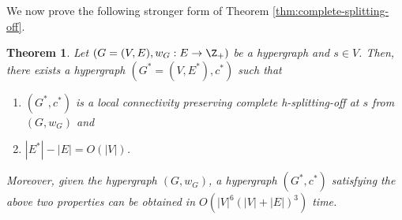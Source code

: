 \documentclass{article}
\newtheorem{theorem}{Theorem}[section]
\begin{document}
We now prove the following stronger form of Theorem \ref{thm:complete-splitting-off}.
\begin{theorem}\label{thm:hypergraphs-splitting-off-stronger-form}
    Let $(G=(V, E), w_G: E\rightarrow \Z_+)$ be a hypergraph and $s\in V$. Then, there exists a hypergraph $(G^*=(V, E^*), c^*)$ such that 
    \begin{enumerate}
        \item $(G^*, c^*)$ is a local connectivity preserving complete h-splitting-off at $s$ from $(G, w_G)$ and 
        \item $|E^*|-|E|=O(|V|)$. 
    \end{enumerate}
    Moreover, given the hypergraph $(G, w_G)$, a hypergraph $(G^*, c^*)$ satisfying the above two properties can be obtained in $O(|V|^6(|V|+|E|)^3)$ time. 
\end{theorem}
\end{document}
